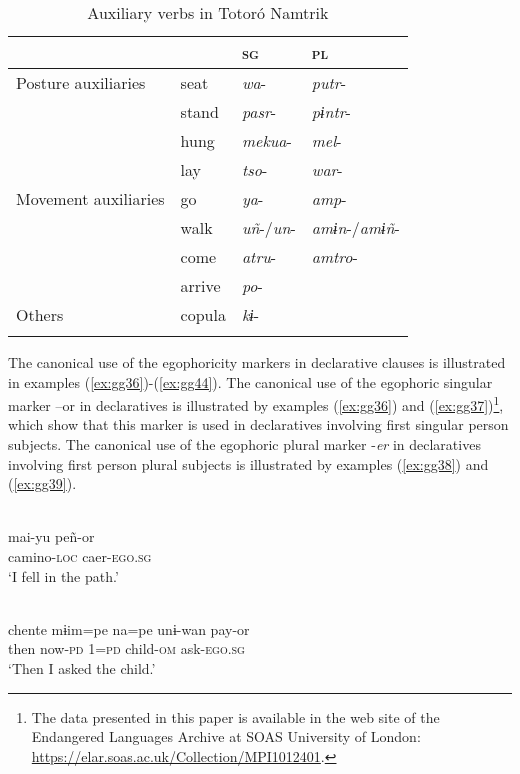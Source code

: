 \documentclass[output=paper]{langsci/langscibook}
\begin{document}
\begin{table}
\begin{tabularx}{\textwidth}{L{2cm}XXX}
\lsptoprule
 &  & \textsc{sg} & \textsc{pl}\\
\midrule
Posture auxiliaries & seat & \textit{wa}- & \textit{putr}-\\
& stand & \textit{pasr}- & \textit{pɨntr}-\\
& hung & \textit{mekua}- & \textit{mel}-\\
& lay & \textit{tso}- & \textit{war}-\\
\hline
Movement auxiliaries & go & \textit{ya}- & \textit{amp}-\\
& walk & \textit{uñ}-/\textit{un}- & \textit{amɨn}-/\textit{amɨñ}-\\
& come & \textit{atru}- & \textit{amtro}-\\
& arrive & \textit{po}- & \\
\hline
Others & copula & \textit{kɨ}- & \\
\lspbottomrule
\end{tabularx}
\caption{Auxiliary verbs in Totoró Namtrik}
\label{tab:gg8}
\end{table}


The canonical use of the egophoricity markers in declarative clauses is illustrated in examples (\ref{ex:gg36})-(\ref{ex:gg44}). The canonical use of the egophoric singular marker –or in declaratives is illustrated by examples (\ref{ex:gg36}) and (\ref{ex:gg37})\footnote{The data presented in this paper is available in the web site of the Endangered Languages Archive at SOAS University of London: \url{https://elar.soas.ac.uk/Collection/MPI1012401}.}, which show that this marker is used in declaratives involving first singular person subjects. The canonical use of the egophoric plural marker -\textit{er} in declaratives involving first person plural subjects is illustrated by examples (\ref{ex:gg38}) and (\ref{ex:gg39}).


\ea \label{ex:gg36}
\\
    \gll mai-yu	peñ-or\\
         camino-\textsc{loc} caer-\textsc{ego.sg}\\
    \glt ‘I fell in the path.'
\z

\ea \label{ex:gg37}
\\
    \gll chente	mɨim=pe	na=pe	unɨ-wan	pay-or\\
         then	now-\textsc{pd}	1=\textsc{pd}	child-\textsc{om}	ask-\textsc{ego.sg}\\
    \glt ‘Then I asked the child.'
\z
\end{document}
